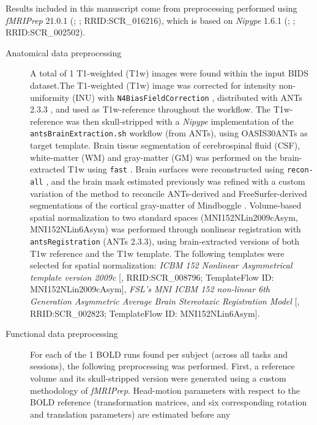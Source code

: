 \documentclass[
]{article}
\author{}
\date{}
\begin{document}
Results included in this manuscript come from preprocessing performed
using \emph{fMRIPrep} 21.0.1 (\citet{fmriprep1}; \citet{fmriprep2};
RRID:SCR\_016216), which is based on \emph{Nipype} 1.6.1
(\citet{nipype1}; \citet{nipype2}; RRID:SCR\_002502).

\begin{description}
\item[Anatomical data preprocessing]
A total of 1 T1-weighted (T1w) images were found within the input BIDS
dataset.The T1-weighted (T1w) image was corrected for intensity
non-uniformity (INU) with \texttt{N4BiasFieldCorrection} \citep{n4},
distributed with ANTs 2.3.3 \citep[RRID:SCR\_004757]{ants}, and used as
T1w-reference throughout the workflow. The T1w-reference was then
skull-stripped with a \emph{Nipype} implementation of the
\texttt{antsBrainExtraction.sh} workflow (from ANTs), using OASIS30ANTs
as target template. Brain tissue segmentation of cerebrospinal fluid
(CSF), white-matter (WM) and gray-matter (GM) was performed on the
brain-extracted T1w using \texttt{fast} \citep[FSL 6.0.5.1:57b01774,
RRID:SCR\_002823,][]{fsl_fast}. Brain surfaces were reconstructed using
\texttt{recon-all} \citep[FreeSurfer 6.0.1,
RRID:SCR\_001847,][]{fs_reconall}, and the brain mask estimated
previously was refined with a custom variation of the method to
reconcile ANTs-derived and FreeSurfer-derived segmentations of the
cortical gray-matter of Mindboggle
\citep[RRID:SCR\_002438,][]{mindboggle}. Volume-based spatial
normalization to two standard spaces (MNI152NLin2009cAsym,
MNI152NLin6Asym) was performed through nonlinear registration with
\texttt{antsRegistration} (ANTs 2.3.3), using brain-extracted versions
of both T1w reference and the T1w template. The following templates were
selected for spatial normalization: \emph{ICBM 152 Nonlinear
Asymmetrical template version 2009c} {[}\citet{mni152nlin2009casym},
RRID:SCR\_008796; TemplateFlow ID: MNI152NLin2009cAsym{]}, \emph{FSL's
MNI ICBM 152 non-linear 6th Generation Asymmetric Average Brain
Stereotaxic Registration Model} {[}\citet{mni152nlin6asym},
RRID:SCR\_002823; TemplateFlow ID: MNI152NLin6Asym{]}.
\item[Functional data preprocessing]
For each of the 1 BOLD runs found per subject (across all tasks and
sessions), the following preprocessing was performed. First, a reference
volume and its skull-stripped version were generated using a custom
methodology of \emph{fMRIPrep}. Head-motion parameters with respect to
the BOLD reference (transformation matrices, and six corresponding
rotation and translation parameters) are estimated before any

\end{description}
\end{document}
